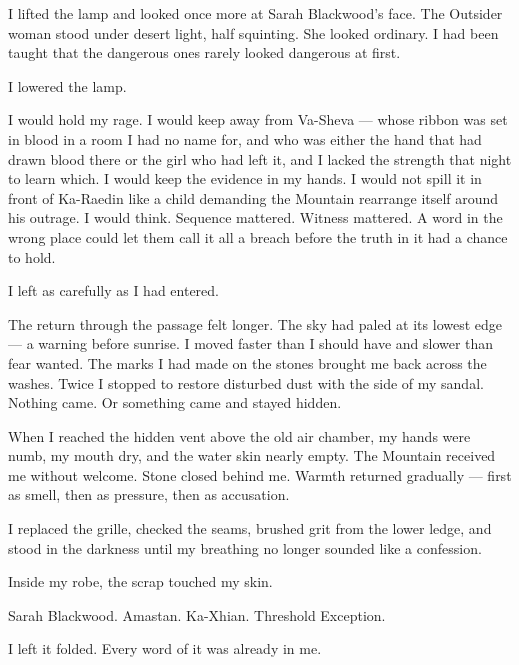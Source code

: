 I lifted the lamp and looked once more at Sarah Blackwood's face. The Outsider woman stood under desert light, half squinting. She looked ordinary. I had been taught that the dangerous ones rarely looked dangerous at first.\par

I lowered the lamp.\par

I would hold my rage. I would keep away from Va-Sheva --- whose ribbon was set in blood in a room I had no name for, and who was either the hand that had drawn blood there or the girl who had left it, and I lacked the strength that night to learn which. I would keep the evidence in my hands. I would not spill it in front of Ka-Raedin like a child demanding the Mountain rearrange itself around his outrage. I would think. Sequence mattered. Witness mattered. A word in the wrong place could let them call it all a breach before the truth in it had a chance to hold.\par

I left as carefully as I had entered.\par

The return through the passage felt longer. The sky had paled at its lowest edge --- a warning before sunrise. I moved faster than I should have and slower than fear wanted. The marks I had made on the stones brought me back across the washes. Twice I stopped to restore disturbed dust with the side of my sandal. Nothing came. Or something came and stayed hidden.\par

When I reached the hidden vent above the old air chamber, my hands were numb, my mouth dry, and the water skin nearly empty. The Mountain received me without welcome. Stone closed behind me. Warmth returned gradually --- first as smell, then as pressure, then as accusation.\par

I replaced the grille, checked the seams, brushed grit from the lower ledge, and stood in the darkness until my breathing no longer sounded like a confession.\par

Inside my robe, the scrap touched my skin.\par

Sarah Blackwood. Amastan. Ka-Xhian. Threshold Exception.\par

I left it folded. Every word of it was already in me.\par

